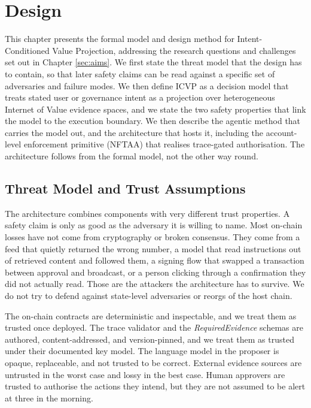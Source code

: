 \section{Design}
\label{sec:design}

This chapter presents the formal model and design method for Intent-Conditioned Value Projection, addressing the research questions and challenges set out in Chapter \ref{sec:aims}. We first state the threat model that the design has to contain, so that later safety claims can be read against a specific set of adversaries and failure modes. We then define ICVP as a decision model that treats stated user or governance intent as a projection over heterogeneous Internet of Value evidence spaces, and we state the two safety properties that link the model to the execution boundary. We then describe the agentic method that carries the model out, and the architecture that hosts it, including the account-level enforcement primitive (NFTAA) that realises trace-gated authorisation. The architecture follows from the formal model, not the other way round.

\subsection{Threat Model and Trust Assumptions}
\label{sec:threat-model}

The architecture combines components with very different trust properties. A safety claim is only as good as the adversary it is willing to name. Most on-chain losses have not come from cryptography or broken consensus. They come from a feed that quietly returned the wrong number, a model that read instructions out of retrieved content and followed them, a signing flow that swapped a transaction between approval and broadcast, or a person clicking through a confirmation they did not actually read. Those are the attackers the architecture has to survive. We do not try to defend against state-level adversaries or reorgs of the host chain.

The on-chain contracts are deterministic and inspectable, and we treat them as trusted once deployed. The trace validator and the \textit{RequiredEvidence} schemas are authored, content-addressed, and version-pinned, and we treat them as trusted under their documented key model. The language model in the proposer is opaque, replaceable, and not trusted to be correct. External evidence sources are untrusted in the worst case and lossy in the best case. Human approvers are trusted to authorise the actions they intend, but they are not assumed to be alert at three in the morning.

